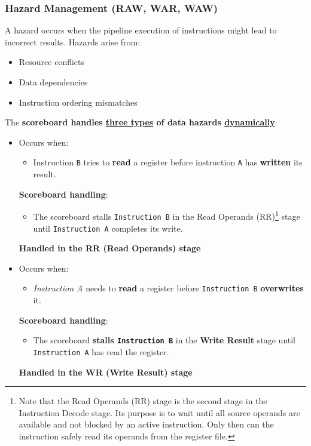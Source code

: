 \subsubsection{Hazard Management (RAW, WAR, WAW)}

A hazard occurs when the pipeline execution of instructions might lead to incorrect results. Hazards arise from:
\begin{itemize}
    \item Resource conflicts
    \item Data dependencies
    \item Instruction ordering mismatches
\end{itemize}
The \textbf{scoreboard handles \underline{three types} of data hazards \underline{dynamically}}:
\begin{itemize}[label=\textcolor{Green3}{}]
    \item {}
    
    Occurs when:
    \begin{itemize}
        \item Instruction \texttt{B} tries to \textbf{read} a register before instruction \texttt{A} has \textbf{written} its result.
    \end{itemize}
    \textbf{Scoreboard handling}:
    \begin{itemize}
        \item The scoreboard stalls \texttt{Instruction B} in the Read Operands (RR)\footnote{%
            Note that the Read Operands (RR) stage is the second stage in the Instruction Decode stage. Its purpose is to wait until all source operands are available and not blocked by an active instruction. Only then can the instruction safely read its operands from the register file.
        } stage until \texttt{Instruction A} completes its write.
    \end{itemize}
    \textcolor{Green3}{ \textbf{Handled in the RR (Read Operands) stage}}


    \item {}

    Occurs when:
    \begin{itemize}
        \item \textsl{Instruction A} needs to \textbf{read} a register before \texttt{Instruction B} \textbf{overwrites} it.
    \end{itemize}
    \textbf{Scoreboard handling}:
    \begin{itemize}
        \item The scoreboard \textbf{stalls \texttt{Instruction B}} in the \textbf{Write Result} stage until \texttt{Instruction A} has read the register.
    \end{itemize}
    \textcolor{Green3}{ \textbf{Handled in the WR (Write Result) stage}}



\end{itemize}
